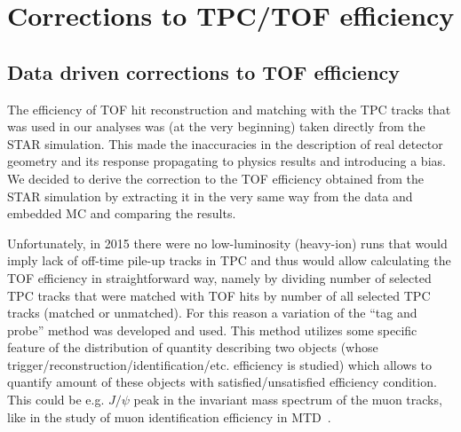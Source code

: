 

\chapter{Corrections to TPC/TOF efficiency}\label{chap:tpcTofEffCorr}

\section{Data driven corrections to TOF efficiency}\label{sec:tofAbsEffCorr}

The efficiency of TOF hit reconstruction and matching with the TPC tracks that was used in our analyses was (at the very beginning) taken directly from the STAR simulation. This made the inaccuracies in the description of real detector geometry and its response propagating to physics results and introducing a bias. We decided to derive the correction to the TOF efficiency obtained from the STAR simulation by extracting it in the very same way from the data and embedded MC and comparing the results.%

Unfortunately, in 2015 there were no low-luminosity (heavy-ion) runs that would imply lack of off-time pile-up tracks in TPC and thus would allow calculating the TOF efficiency in straightforward way, namely by dividing number of selected TPC tracks that were matched with TOF hits by number of all selected TPC tracks (matched or unmatched). For this reason a variation of the ``tag and probe'' method was developed and used. This method utilizes some specific feature of the distribution of quantity describing two objects (whose trigger/reconstruction/identification/etc. efficiency is studied) which allows to quantify amount of these objects with satisfied/unsatisfied efficiency condition. This could be e.g. $J/\psi$ peak in the invariant mass spectrum of the muon tracks, like in the study of muon identification efficiency in MTD~\cite{Huang:2016dbm}. %

